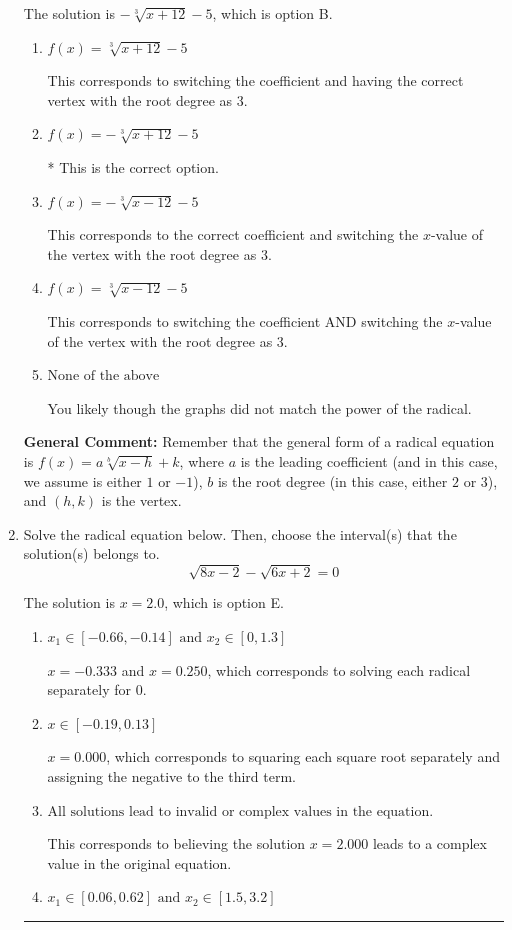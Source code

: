 \documentclass{extbook}[14pt]
\newcommand{\litem}[1]{\item #1

\rule{\textwidth}{0.4pt}}
\begin{document}
\begin{enumerate}
{The solution is \( - \sqrt[3]{x + 12} - 5 \), which is option B.\begin{enumerate}[label=\Alph*.]
\item \( f(x) = \sqrt[3]{x + 12} - 5 \)

This corresponds to switching the coefficient and having the correct vertex with the root degree as $3$.
\item \( f(x) = - \sqrt[3]{x + 12} - 5 \)

* This is the correct option.
\item \( f(x) = - \sqrt[3]{x - 12} - 5 \)

This corresponds to the correct coefficient and switching the $x$-value of the vertex with the root degree as $3$.
\item \( f(x) = \sqrt[3]{x - 12} - 5 \)

This corresponds to switching the coefficient AND switching the $x$-value of the vertex with the root degree as $3$.
\item \( \text{None of the above} \)

You likely though the graphs did not match the power of the radical.
\end{enumerate}

\textbf{General Comment:} Remember that the general form of a radical equation is $ f(x) = a \sqrt[b]{x - h} + k$, where $a$ is the leading coefficient (and in this case, we assume is either $1$ or $-1$), $b$ is the root degree (in this case, either $2$ or $3$), and $(h, k)$ is the vertex.
}
\litem{
Solve the radical equation below. Then, choose the interval(s) that the solution(s) belongs to.
\[ \sqrt{8 x - 2} - \sqrt{6 x + 2} = 0 \]

The solution is \( x = 2.0 \), which is option E.\begin{enumerate}[label=\Alph*.]
\item \( x_1 \in [-0.66, -0.14] \text{ and } x_2 \in [0,1.3] \)

$x = -0.333$ and $x = 0.250$, which corresponds to solving each radical separately for 0.
\item \( x \in [-0.19,0.13] \)

$x = 0.000$, which corresponds to squaring each square root separately and assigning the negative to the third term.
\item \( \text{All solutions lead to invalid or complex values in the equation.} \)

This corresponds to believing the solution $x = 2.000$ leads to a complex value in the original equation.
\item \( x_1 \in [0.06, 0.62] \text{ and } x_2 \in [1.5,3.2] \)


\end{enumerate}}
\end{enumerate}
\end{document}

